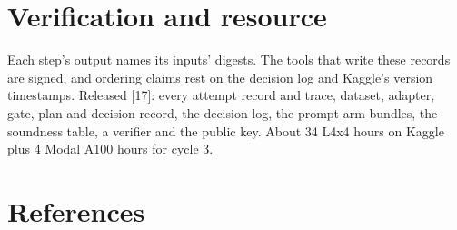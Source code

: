 \documentclass[
  11pt,
  a4paper,
]{article}
\begin{document}
\section{Verification and resource}\label{verification-and-resource}

Each step's output names its inputs' digests. The tools that write these
records are signed, and ordering claims rest on the decision log and
Kaggle's version timestamps. Released {[}17{]}: every attempt record and
trace, dataset, adapter, gate, plan and decision record, the decision
log, the prompt-arm bundles, the soundness table, a verifier and the
public key. About 34 L4x4 hours on Kaggle plus 4 Modal A100 hours for
cycle 3.

\section*{References}\label{references}
\end{document}
